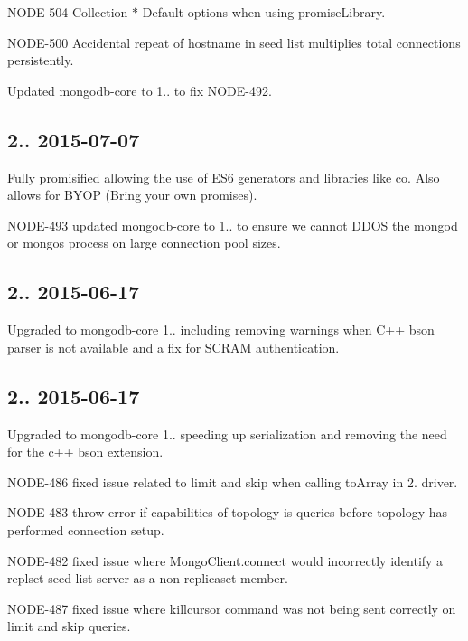 \begin{DoxyItemize}
\item N\+O\+D\+E-\/504 Collection $\ast$ Default options when using promise\+Library.
\item N\+O\+D\+E-\/500 Accidental repeat of hostname in seed list multiplies total connections persistently.
\item Updated mongodb-\/core to 1.. to fix N\+O\+D\+E-\/492.
\end{DoxyItemize}

\subsection*{2.. 2015-\/07-\/07 }


\begin{DoxyItemize}
\item Fully promisified allowing the use of E\+S6 generators and libraries like co. Also allows for B\+Y\+OP (Bring your own promises).
\item N\+O\+D\+E-\/493 updated mongodb-\/core to 1.. to ensure we cannot D\+D\+OS the mongod or mongos process on large connection pool sizes.
\end{DoxyItemize}

\subsection*{2.. 2015-\/06-\/17 }


\begin{DoxyItemize}
\item Upgraded to mongodb-\/core 1.. including removing warnings when C++ bson parser is not available and a fix for S\+C\+R\+AM authentication.
\end{DoxyItemize}

\subsection*{2.. 2015-\/06-\/17 }


\begin{DoxyItemize}
\item Upgraded to mongodb-\/core 1.. speeding up serialization and removing the need for the c++ bson extension.
\item N\+O\+D\+E-\/486 fixed issue related to limit and skip when calling to\+Array in 2. driver.
\item N\+O\+D\+E-\/483 throw error if capabilities of topology is queries before topology has performed connection setup.
\item N\+O\+D\+E-\/482 fixed issue where Mongo\+Client.\+connect would incorrectly identify a replset seed list server as a non replicaset member.
\item N\+O\+D\+E-\/487 fixed issue where killcursor command was not being sent correctly on limit and skip queries.
\end{DoxyItemize}

